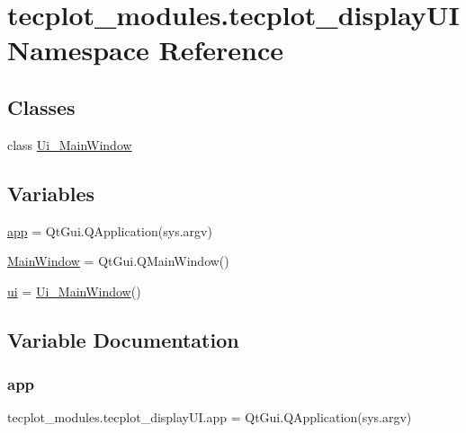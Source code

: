 \hypertarget{a00064}{}\section{tecplot\+\_\+modules.\+tecplot\+\_\+display\+UI Namespace Reference}
\label{a00064}
\subsection*{Classes}
\begin{DoxyCompactItemize}
\item 
class \hyperlink{a00114}{Ui\+\_\+\+Main\+Window}
\end{DoxyCompactItemize}
\subsection*{Variables}
\begin{DoxyCompactItemize}
\item 
\hyperlink{a00064_af6c75ceae00a9a5ef4b5025551b09205}{app} = Qt\+Gui.\+Q\+Application(sys.\+argv)
\item 
\hyperlink{a00064_a05b56eca3c779fabf41fa975030e6ca1}{Main\+Window} = Qt\+Gui.\+Q\+Main\+Window()
\item 
\hyperlink{a00064_aa95df04768ef9b320020d0084673133a}{ui} = \hyperlink{a00114}{Ui\+\_\+\+Main\+Window}()
\end{DoxyCompactItemize}


\subsection{Variable Documentation}
\hypertarget{a00064_af6c75ceae00a9a5ef4b5025551b09205}{}\label{a00064_af6c75ceae00a9a5ef4b5025551b09205} 
\subsubsection{\texorpdfstring{app}{app}}
{\footnotesize\ttfamily tecplot\+\_\+modules.\+tecplot\+\_\+display\+U\+I.\+app = Qt\+Gui.\+Q\+Application(sys.\+argv)}

\hypertarget{a00064_a05b56eca3c779fabf41fa975030e6ca1}{}\label{a00064_a05b56eca3c779fabf41fa975030e6ca1} 
